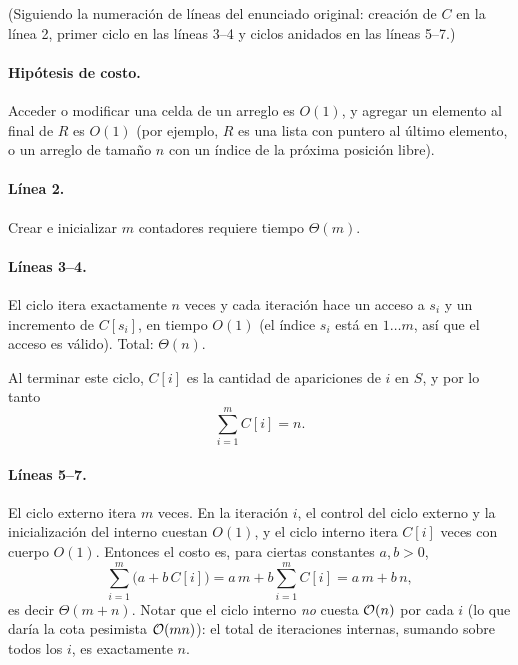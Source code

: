 (Siguiendo la numeración de líneas del enunciado original: creación de $C$ en la línea 2, primer ciclo
en las líneas 3--4 y ciclos anidados en las líneas 5--7.)

\paragraph{Hipótesis de costo.} Acceder o modificar una celda de un arreglo es $O(1)$, y
agregar un elemento al final de $R$ es $O(1)$ (por ejemplo, $R$ es una lista con puntero al
último elemento, o un arreglo de tamaño $n$ con un índice de la próxima posición libre).

\paragraph{Línea 2.} Crear e inicializar $m$ contadores requiere tiempo $\Theta(m)$.

\paragraph{Líneas 3--4.} El ciclo itera exactamente $n$ veces y cada iteración hace un acceso a
$s_i$ y un incremento de $C[s_i]$, en tiempo $O(1)$ (el índice $s_i$ está en $1\dots m$, así
que el acceso es válido). Total: $\Theta(n)$.

Al terminar este ciclo, $C[i]$ es la cantidad de apariciones de $i$ en $S$, y por lo tanto
\[
\sum_{i=1}^{m} C[i]=n .
\]

\paragraph{Líneas 5--7.} El ciclo externo itera $m$ veces. En la iteración $i$, el control del
ciclo externo y la inicialización del interno cuestan $O(1)$, y el ciclo interno itera $C[i]$
veces con cuerpo $O(1)$. Entonces el costo es, para ciertas constantes $a,b>0$,
\[
\sum_{i=1}^{m}\bigl(a+b\,C[i]\bigr)=a\,m+b\sum_{i=1}^{m}C[i]=a\,m+b\,n,
\]
es decir $\Theta(m+n)$. Notar que el ciclo interno \emph{no} cuesta $\mathcal{O}(n)$ por cada $i$
(lo que daría la cota pesimista $\mathcal{O}(mn)$): el total de iteraciones internas, sumando sobre todos
los $i$, es exactamente $n$.


